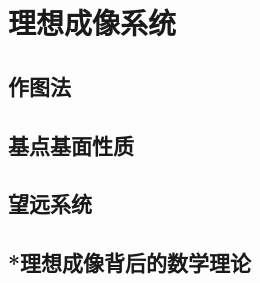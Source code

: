 

\section{理想成像系统}\label{23-2}

\subsection{作图法}\label{23-2-1}

\subsection{基点基面性质}\label{23-2-2}

\subsection{望远系统}\label{23-2-3}

\subsection{*理想成像背后的数学理论}\label{23-2-4}